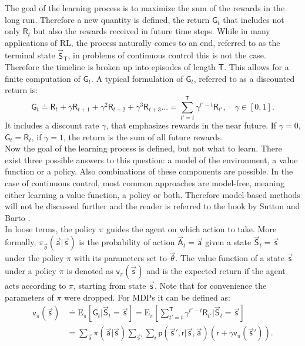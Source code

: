 The goal of the learning process is to maximize the sum of the rewards in the long run. Therefore a new quantity is defined, the return $\mathsf{G}_t$ that includes not only $\mathsf{R}_t$ but also the rewards received in future time steps. While in many applications of RL, the process naturally comes to an end, referred to as the terminal state $\vec{\mathsf{S}}_\mathsf{T}$, in problems of continuous control this is not the case. Therefore the timeline is broken up into episodes of length $\mathsf{T}$. This allows for a finite computation of $\mathsf{G}_t$. A typical formulation of $\mathsf{G}_t$, referred to as a discounted return is:
\begin{equation}
\mathsf{G}_t \doteq \mathsf{R}_t + \gamma \mathsf{R}_{t+1} + \gamma^2 \mathsf{R}_{t+2} + \gamma^3 \mathsf{R}_{t+3}... = \sum_{t'=t}^{\mathsf{T}}\gamma^{t'-t} \mathsf{R}_{t'},\quad \gamma \in [0, 1]. \label{eq:return}
\end{equation}
It includes a discount rate $\gamma$, that emphasizes rewards in the near future. If $\gamma = 0$, $\mathsf{G}_t = \mathsf{R}_t$, if $\gamma = 1$, the return is the sum of all future rewards. \cite[p. 47- 57]{sutton_reinforcement_2018} \\
Now the goal of the learning process is defined, but not what to learn. There exist three possible answers to this question: a model of the environment, a value function or a policy. Also combinations of these components are possible. In the case of continuous control, most common approaches are model-free, meaning either learning a value function, a policy or both. Therefore model-based methods will not be discussed further and the reader is referred to the book by Sutton and Barto \cite{sutton_reinforcement_2018}. \\
In loose terms, the policy $\pi$ guides the agent on which action to take. More formally, $\pi_{\vec{\theta}}(\vec{\mathsf{a}}|\vec{\mathsf{s}})$ is the probability of action $\vec{\mathsf{A}}_t=\vec{\mathsf{a}}$ given a state $\vec{\mathsf{S}}_t=\vec{\mathsf{s}}$ under the policy $\pi$ with its parameters set to $\vec{\theta}$. The value function of a state $\vec{\mathsf{s}}$ under a policy $\pi$ is denoted as $\mathsf{v}_{\pi}(\vec{\mathsf{s}})$ and is the expected return if the agent acts according to $\pi$, starting from state $\vec{\mathsf{s}}$. Note that for convenience the parameters of $\pi$ were dropped. For MDPs it can be defined as:
\begin{align}
	\mathsf{v}_{\pi}(\vec{\mathsf{s}}) &\doteq \mathrm{E}_\pi \left[ \mathsf{G}_t \vert \vec{\mathsf{S}}_t= \vec{\mathsf{s}} \right] =
	\mathrm{E}_\pi \left[\sum_{t'=t}^{\mathsf{T}}\gamma^{t'-t} \mathsf{R}_{t'} \vert \vec{\mathsf{S}}_t=\vec{\mathsf{s}}\right] \label{eq:value_func} \\
	&= \sum_{\vec{\mathsf{a}}} \pi(\vec{\mathsf{a}} \vert \vec{\mathsf{s}})
	\sum_{\vec{\mathsf{s}}'} \sum_{\mathsf{r}} \mathsf{p}(\vec{\mathsf{s}}',\mathsf{r} \vert \vec{\mathsf{s}},\vec{\mathsf{a}}) \left( \mathsf{r} + \gamma \mathsf{v}_\pi(\vec{\mathsf{s}}') \right). \label{eq:Bellmann}
\end{align}
